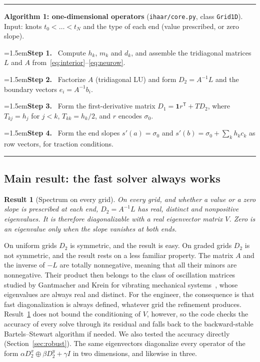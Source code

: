 \documentclass[preprint,12pt]{elsarticle}
\newtheorem{result}{Result}
\theoremstyle{remark}
\newcommand{\step}[1]{\par\noindent\hangindent=1.5em\hangafter=1\textbf{Step #1.}\ }
\begin{document}
\begin{algorithm}[t]\small\hrule\smallskip
\noindent\textbf{Algorithm 1: one-dimensional operators} (\texttt{ihaar/core.py}, class \texttt{Grid1D}).
Input: knots $t_0<\dots<t_N$ and the type of each end (value prescribed, or zero slope).
\step{1} Compute $h_k$, $m_k$ and $d_k$, and assemble the tridiagonal matrices $L$ and $A$ from~\eqref{eq:interior}--\eqref{eq:neurow}.
\step{2} Factorize $A$ (tridiagonal LU) and form $D_2=A^{-1}L$ and the boundary vectors $e_i=A^{-1}b_i$.
\step{3} Form the first-derivative matrix $D_1=\mathbf 1r^{\mathsf T}+TD_2$, where $T_{kj}=h_j$ for $j<k$, $T_{kk}=h_k/2$, and $r$ encodes $\sigma_0$.
\step{4} Form the end slopes $s'(a)=\sigma_0$ and $s'(b)=\sigma_0+\sum_kh_kc_k$ as row vectors, for traction conditions.
\smallskip\hrule
\end{algorithm}

\subsection{Main result: the fast solver always works}
\begin{result}[Spectrum on every grid]\label{thm:spectrum}
On every grid, and whether a value or a zero slope is prescribed at each end, $D_2=A^{-1}L$ has real,
distinct and nonpositive eigenvalues. It is therefore diagonalizable with a real eigenvector matrix
$V$. Zero is an eigenvalue only when the slope vanishes at both ends.
\end{result}

On uniform grids $D_2$ is symmetric, and the result is easy. On graded grids $D_2$ is not symmetric, and
the result rests on a less familiar property. The matrix $A$ and the inverse of $-L$ are totally
nonnegative, meaning that all their minors are nonnegative. Their product then belongs to the class of
oscillation matrices studied by Gantmacher and Krein for vibrating mechanical
systems~\cite{gantmacher2002oscillation}, whose eigenvalues are always real and distinct. For the engineer, the consequence is that fast diagonalization is always defined, whatever grid the
refinement produces. Result~\ref{thm:spectrum} does not bound the conditioning of $V$, however, so the
code checks the accuracy of every solve through its residual and falls back to the backward-stable
Bartels--Stewart algorithm if needed. We also tested the accuracy directly (Section~\ref{sec:robust}). The same eigenvectors diagonalize every operator of the form
$\alpha D_2^x\oplus\beta D_2^y+\gamma I$ in two dimensions, and likewise in three.
\end{document}
